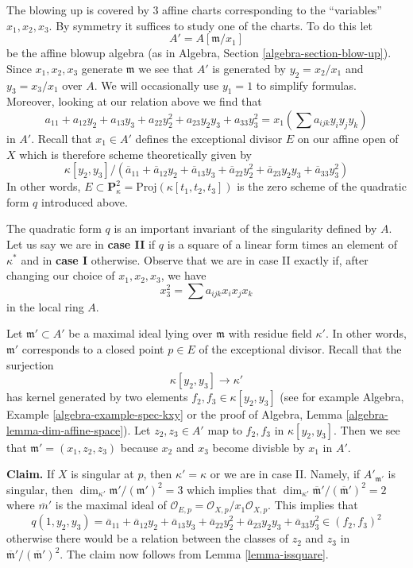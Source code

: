 \medskip\noindent
The blowing up is covered by $3$ affine charts corresponding to
the ``variables'' $x_1, x_2, x_3$. By symmetry it suffices to study
one of the charts. To do this let
$$
A' = A[\mathfrak m/x_1]
$$
be the affine blowup algebra (as in
Algebra, Section \ref{algebra-section-blow-up}).
Since $x_1, x_2, x_3$ generate $\mathfrak m$ we see that $A'$
is generated by $y_2 = x_2/x_1$ and $y_3 = x_3/x_1$ over $A$.
We will occasionally use $y_1 = 1$ to simplify formulas.
Moreover, looking at our relation above we find that
$$
a_{11} + a_{12} y_2 + a_{13} y_3 + a_{22} y_2^2 +
a_{23} y_2y_3 + a_{33} y_3^2 =
x_1 (\sum a_{ijk} y_iy_jy_k)
$$
in $A'$. Recall that $x_1 \in A'$ defines the exceptional divisor $E$
on our affine open of $X$
which is therefore scheme theoretically given by
$$
\kappa[y_2, y_3]/
(\overline{a}_{11} + \overline{a}_{12} y_2 + \overline{a}_{13} y_3 +
\overline{a}_{22} y_2^2 + \overline{a}_{23} y_2y_3 + \overline{a}_{33} y_3^2)
$$
In other words,
$E \subset \mathbf{P}^2_\kappa = \text{Proj}(\kappa[t_1, t_2, t_3])$ is
the zero scheme of the quadratic form $q$ introduced above.

\medskip\noindent
The quadratic form $q$ is an important invariant of the singularity
defined by $A$. Let us say we are in
{\bf case II} if $q$ is a square of a linear form times
an element of $\kappa^*$ and in {\bf case I} otherwise.
Observe that we are in case II exactly if, after
changing our choice of $x_1, x_2, x_3$, we have
$$
x_3^2 = \sum a_{ijk}x_ix_jx_k
$$
in the local ring $A$.

\medskip\noindent
Let $\mathfrak m' \subset A'$ be a maximal ideal lying over $\mathfrak m$
with residue field $\kappa'$. In other words, $\mathfrak m'$ corresponds
to a closed point $p \in E$ of the exceptional divisor. Recall that the
surjection
$$
\kappa[y_2, y_3] \to \kappa'
$$
has kernel generated by two elements $f_2, f_3 \in \kappa[y_2, y_3]$
(see for example Algebra, Example \ref{algebra-example-spec-kxy}
or the proof of
Algebra, Lemma \ref{algebra-lemma-dim-affine-space}).
Let $z_2, z_3 \in A'$ map to $f_2, f_3$ in $\kappa[y_2, y_3]$.
Then we see that $\mathfrak m' = (x_1, z_2, z_3)$ because
$x_2$ and $x_3$ become divisble by $x_1$ in $A'$.

\medskip\noindent
{\bf Claim.} If $X$ is singular at $p$, then $\kappa' = \kappa$ or we are
in case II. Namely, if $A'_{\mathfrak m'}$
is singular, then $\dim_{\kappa'} \mathfrak m'/(\mathfrak m')^2 = 3$
which implies that
$\dim_{\kappa'} \overline{\mathfrak m}'/(\overline{\mathfrak m}')^2 = 2$
where $\overline{m}'$ is the maximal ideal of
$\mathcal{O}_{E, p} = \mathcal{O}_{X, p}/x_1\mathcal{O}_{X, p}$.
This implies that
$$
q(1, y_2, y_3) =
\overline{a}_{11} + \overline{a}_{12} y_2 + \overline{a}_{13} y_3 +
\overline{a}_{22} y_2^2 + \overline{a}_{23} y_2y_3 + \overline{a}_{33} y_3^2
\in (f_2, f_3)^2
$$
otherwise there would be a relation between the classes of $z_2$
and $z_3$ in $\overline{\mathfrak m}'/(\overline{\mathfrak m}')^2$.
The claim now follows from Lemma \ref{lemma-issquare}.


